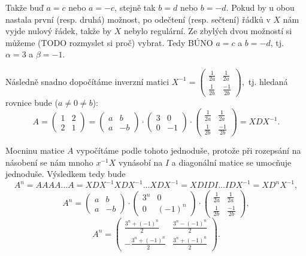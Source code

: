 \documentclass[12pt]{article}					%
\begin{document}
\begin{priklad}[5.bonus]
\begin{reseni}
            Takže buď $a=c$ nebo $a=-c$, stejně tak $b=d$ nebo $b=-d$. Pokud by u obou nastala první (resp. druhá) možnost, po odečtení (resp. sečtení) řádků v $X$ nám vyjde nulový řádek, takže by $X$ nebylo regulární. Ze zbylých dvou možností si můžeme (TODO rozmyslet si proč) vybrat. Tedy BÚNO $a=c$ a $b=-d$, tj. $\alpha = 3$ a $\beta = -1$.

            Následně snadno dopočítáme inverzní matici
            $ X^{-1} = \begin{pmatrix} \frac{1}{2a} & \frac{1}{2a} \\ \frac{1}{2b} & \frac{-1}{2b} \end{pmatrix}, $
            tj. hledaná rovnice bude ($a ≠ 0 ≠ b$):
            $$ A = \begin{pmatrix} 1 & 2 \\ 2 & 1 \end{pmatrix} = \begin{pmatrix} a & b \\ a & -b  \end{pmatrix} · \begin{pmatrix} 3 & 0 \\ 0 & -1 \end{pmatrix} · \begin{pmatrix} \frac{1}{2a} & \frac{1}{2a} \\ \frac{1}{2b} & \frac{-1}{2b} \end{pmatrix} = XDX^{-1}. $$

            Mocninu matice $A$ vypočítáme podle tohoto jednoduše, protože při rozepsání na násobení se nám mnoho $x^{-1}X$ vynásobí na $I$ a diagonální matice se umocňuje jednoduše. Výsledkem tedy bude
            $$ A^n = AAAA…A = XDX^{-1}XDX^{-1}…XDX^{-1} = XDIDI…IDX^{-1} = XD^nX^{-1}, $$ 
            $$ A^n = \begin{pmatrix} a & b \\ a & -b  \end{pmatrix} · \begin{pmatrix} 3^n & 0 \\ 0 & (-1)^n \end{pmatrix} · \begin{pmatrix} \frac{1}{2a} & \frac{1}{2a} \\ \frac{1}{2b} & \frac{-1}{2b} \end{pmatrix}, $$
            $$ A^n = \begin{pmatrix} \frac{3^n+(-1)^n}{2} &  \frac{3^n-(-1)^n}{2} \\ -\frac{3^n+(-1)^n}{2} &  \frac{3^n+(-1)^n}{2} \end{pmatrix}. $$ 

        \end{reseni}
    \end{priklad}
\end{document}
